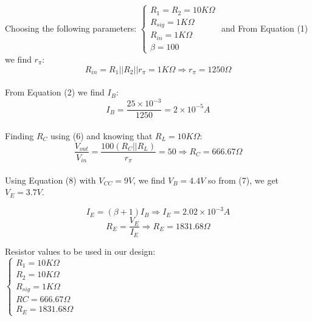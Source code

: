 \documentclass[conference]{IEEEtran}
\begin{document}
\noindent Choosing the following parameters:
$
\begin{cases}
    R_1 = R_2 = 10K\Omega\\
    R_{sig} = 1K\Omega\\
    R_{in} = 1K\Omega\\
    \beta = 100
\end{cases}$ and From Equation (1) we find $r_\pi$:\\
\[R_{in} = R_1 || R_2 || r_\pi = 1K\Omega \Rightarrow r_\pi = 1250\Omega\]\\

\noindent From Equation (2) we find $I_B$:
\[I_B = \frac{25 \times10^{-3}}{1250} = 2 \times 10^{-5}A\]\\

\noindent Finding $R_C$ using (6) and knowing that $R_L = 10K\Omega$:\\
\[\frac{V_{out}}{V_{in}} = \frac{100(R_C || R_L)}{r_\pi} = 50 \Rightarrow \boxed{R_C = 666.67\Omega}\]\\

\noindent Using Equation (8) with $V_{CC} = 9V$, we find $V_B = 4.4V$ so from (7), we get $V_E = 3.7V$.

\[I_E = (\beta + 1)I_B \Rightarrow I_E = 2.02 \times 10^{-3}A\]
\[R_E = \frac{V_E}{I_E} \Rightarrow \boxed{R_E = 1831.68\Omega}\]

\vspace{2cm}

Resistor values to be used in our design:\\
\center
$\begin{cases}
    R_1 = 10K\Omega\\
    R_2 = 10K\Omega\\
    R_{sig} = 1K\Omega\\
    RC = 666.67 \Omega\\
    R_E = 1831.68\Omega
\end{cases}$
\end{document}
